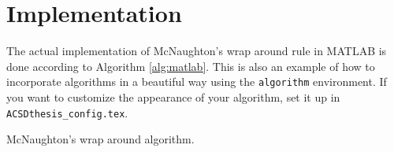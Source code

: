 \chapter{Implementation}
\thispagestyle{empty}
The actual implementation of McNaughton's wrap around rule in MATLAB is done according to Algorithm \ref{alg:matlab}. This is also an example of how to incorporate algorithms in a beautiful way using the \texttt{algorithm} environment. If you want to customize the appearance of your algorithm, set it up in \texttt{ACSDthesis\_config.tex}. 

\begin{algorithm}[h]
\caption{McNaughton's wrap around algorithm.}
\label{alg:matlab}
\end{algorithm}










